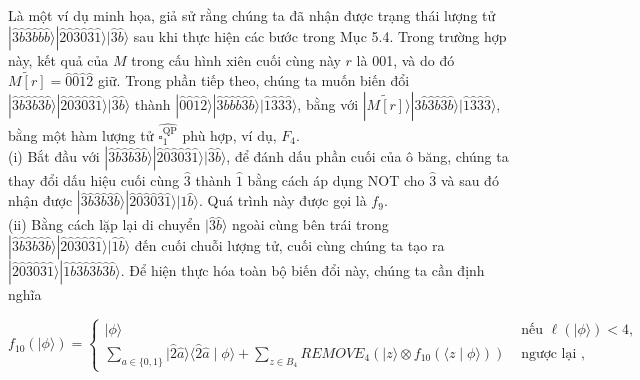 \documentclass[10pt]{article}
\begin{document}
Là một ví dụ minh họa, giả sử rằng chúng ta đã nhận được trạng thái lượng tử $|\hat{3} \hat{b} \hat{3} \hat{b} \hat{b} \hat{b}\rangle|\hat{2} \hat{0} \hat{3} \hat{0} \hat{3} \hat{1}\rangle|\hat{3} \hat{b}\rangle$ sau khi thực hiện các bước trong Mục 5.4. Trong trường hợp này, kết quả của $M$ trong cấu hình xiên cuối cùng này $r$ là 001, và do đó $\widetilde{M[r]}=\hat{0} \hat{0} \hat{1} \hat{2}$ giữ. Trong phần tiếp theo, chúng ta muốn biến đổi $|\hat{3} \hat{b} \hat{3} \hat{b} \hat{3} \hat{b}\rangle|\hat{2} \hat{0} \hat{3} \hat{0} \hat{3} \hat{1}\rangle|\hat{3} \hat{b}\rangle$ thành $|\hat{0} \hat{0} \hat{1} \hat{2}\rangle|\hat{3} \hat{b} \hat{b} \hat{b} \hat{3} \hat{b}\rangle|\hat{1} \hat{3} \hat{3} \hat{3}\rangle$, bằng với $|\widetilde{M[r]}\rangle|\hat{3} \hat{b} \hat{3} \hat{b} \hat{3} \hat{b}\rangle|\hat{1} \hat{3} \hat{3} \hat{3}\rangle$, bằng một hàm lượng tử $\widehat{\square_{1}^{\mathrm{QP}}}$ phù hợp, ví dụ, $F_{4}$.\\
(i) Bắt đầu với $|\hat{3} \hat{b} \hat{3} \hat{b} \hat{3} \hat{b}\rangle|\hat{2} \hat{0} \hat{3} \hat{0} \hat{3} \hat{1}\rangle|\hat{3} \hat{b}\rangle$, để đánh dấu phần cuối của ô băng, chúng ta thay đổi dấu hiệu cuối cùng $\hat{3}$ thành $\hat{1}$ bằng cách áp dụng NOT cho $\hat{3}$ và sau đó nhận được $|\hat{3} \hat{b} \hat{3} \hat{b} \hat{3} \hat{b}\rangle|\hat{2} \hat{0} \hat{3} \hat{0} \hat{3} \hat{1}\rangle|\hat{1} \hat{b}\rangle$. Quá trình này được gọi là $f_{9}$.\\
(ii) Bằng cách lặp lại di chuyển $|\hat{3} \hat{b}\rangle$ ngoài cùng bên trái trong $|\hat{3} \hat{b} \hat{3} \hat{b} \hat{3} \hat{b}\rangle|\hat{2} \hat{0} \hat{3} \hat{0} \hat{3} \hat{1}\rangle|\hat{1} \hat{b}\rangle$ đến cuối chuỗi lượng tử, cuối cùng chúng ta tạo ra $|\hat{2} \hat{0} \hat{3} \hat{0} \hat{3} \hat{1}\rangle|\hat{1} \hat{b} \hat{3} \hat{b} \hat{3} \hat{b} \hat{3} \hat{b}\rangle$. Để hiện thực hóa toàn bộ biến đổi này, chúng ta cần định nghĩa

$$
f_{10}(|\phi\rangle)= \begin{cases}|\phi\rangle & \text { nếu } \ell(|\phi\rangle)<4, \\ \sum_{a \in\{0,1\}}|\hat{2} \hat{a}\rangle\langle\hat{2} \hat{a} \mid \phi\rangle+\sum_{z \in B_{4}} R E M O V E_{4}\left(|z\rangle \otimes f_{10}(\langle z \mid \phi\rangle)\right) & \text { ngược lại },\end{cases}
$$
\end{document}
